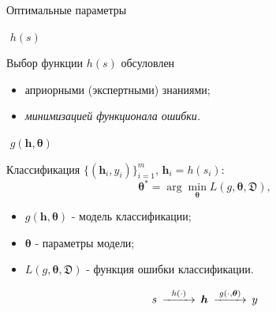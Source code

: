 \documentclass{beamer}
\begin{document}
\begin{frame}{Оптимальные параметры}
	\begin{minipage}[t]{0.15\columnwidth}
		\vspace{-0.6cm}
		\begin{block}{}
			\centering
			\vspace{0.5cm}
			$\,\,h(s)$
			\vspace{0.5cm}
		\end{block}
	\end{minipage}	
	\hfill
	\begin{minipage}[t]{0.8\columnwidth}
			Выбор функции $h(s)$ обсуловлен
			\begin{itemize}
				\item априорными (экспертными) знаниями;
				\item \textit{минимизацией функционала ошибки.}
			\end{itemize}
	\end{minipage}
\vfill
	\begin{minipage}[t]{0.15\columnwidth}
		\vspace{-0.6cm}
		\begin{block}{}
			\centering
			\vspace{1.5cm}
			$\,\,g(\bm{h}, \bm\theta)$
			\vspace{1.5cm}
		\end{block}
	\end{minipage}	
	\hfill
	\begin{minipage}[t]{0.8\columnwidth}
			Классификация $\{(\bm{h}_i , y_i)\}_{i=1}^m$, $\bm{h}_i = h(s_i)$:
			\[
				\bm{\theta}^* = \arg \min_{\bm\theta} L(g, \bm\theta, \mathfrak{D}),
			\]
		\vspace{-0.3cm}
		\begin{itemize}
		\item $g(\mathbf{h}, \bm\theta)$ - модель классификации;
		\item $\bm\theta$ - параметры модели;
		\item $L (g, \bm\theta, \mathfrak{D})$ - функция ошибки классификации.
		\end{itemize}
	\begin{block}{}
	\[
	\begin{CD} s@>h(\cdot)>> \bm{h} @>g(\cdot, \bm{\theta})>> y
	\end{CD}
	\]
	\end{block}
	\end{minipage}	

\end{frame}
\end{document}
